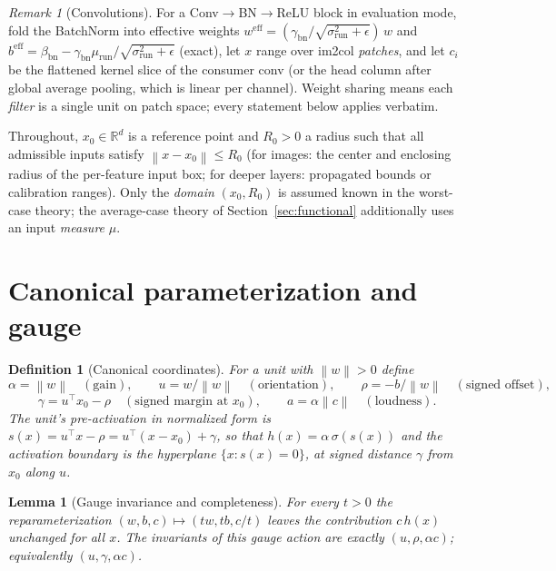 \documentclass[11pt]{article}
\newtheorem{lemma}[theorem]{Lemma}
\newtheorem{definition}[theorem]{Definition}
\theoremstyle{remark}
\newtheorem{remark}[theorem]{Remark}
\newcommand{\R}{\mathbb{R}}
\newcommand{\relu}{\sigma}
\newcommand{\norm}[1]{\left\lVert #1 \right\rVert}
\begin{document}
\begin{remark}[Convolutions]\label{rem:conv}
For a Conv$\to$BN$\to$ReLU block in evaluation mode, fold the BatchNorm into
effective weights $w^{\mathrm{eff}} = (\gamma_{\mathrm{bn}}/
\sqrt{\sigma^2_{\mathrm{run}}+\epsilon})\,w$ and
$b^{\mathrm{eff}} = \beta_{\mathrm{bn}} - \gamma_{\mathrm{bn}}
\mu_{\mathrm{run}}/\sqrt{\sigma^2_{\mathrm{run}}+\epsilon}$ (exact), let $x$
range over im2col \emph{patches}, and let $c_i$ be the flattened kernel slice
of the consumer conv (or the head column after global average pooling, which
is linear per channel). Weight sharing means each \emph{filter} is a single
unit on patch space; every statement below applies verbatim.
\end{remark}

Throughout, $x_0 \in \R^d$ is a reference point and $R_0 > 0$ a radius such
that all admissible inputs satisfy $\norm{x - x_0} \le R_0$ (for images: the
center and enclosing radius of the per-feature input box; for deeper layers:
propagated bounds or calibration ranges). Only the \emph{domain} $(x_0,R_0)$
is assumed known in the worst-case theory; the average-case theory of
Section~\ref{sec:functional} additionally uses an input \emph{measure} $\mu$.

\section{Canonical parameterization and gauge}\label{sec:param}

\begin{definition}[Canonical coordinates]\label{def:coords}
For a unit with $\norm{w} > 0$ define
\[
  \alpha = \norm{w} \quad (\text{gain}), \qquad
  u = w/\norm{w} \quad (\text{orientation}), \qquad
  \rho = -b/\norm{w} \quad (\text{signed offset}),
\]
\[
  \gamma = u^\top x_0 - \rho \quad (\text{signed margin at } x_0), \qquad
  a = \alpha \norm{c} \quad (\text{loudness}).
\]
The unit's pre-activation in normalized form is
$s(x) = u^\top x - \rho = u^\top (x - x_0) + \gamma$, so that
$h(x) = \alpha\,\relu(s(x))$ and the activation boundary is the hyperplane
$\{x : s(x)=0\}$, at signed distance $\gamma$ from $x_0$ along $u$.
\end{definition}

\begin{lemma}[Gauge invariance and completeness]\label{lem:gauge}
For every $t>0$ the reparameterization $(w,b,c) \mapsto (tw, tb, c/t)$ leaves
the contribution $c\,h(x)$ unchanged for all $x$. The invariants of this gauge
action are exactly $(u, \rho, \alpha c)$; equivalently $(u,\gamma,\alpha c)$.
\end{lemma}
\end{document}
